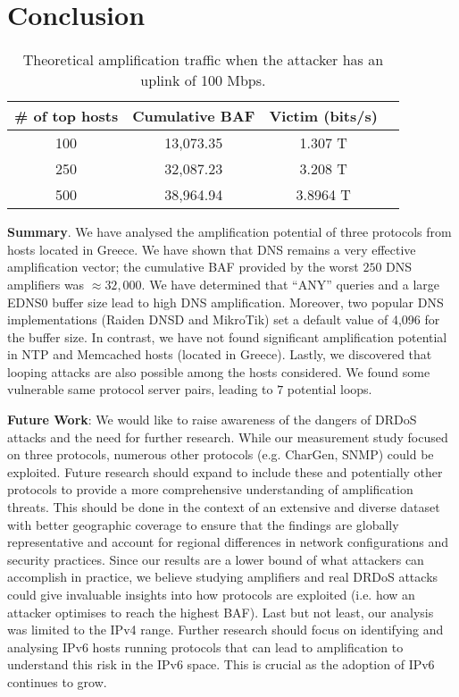\section{Conclusion}

\captionsetup{font=normalsize}
\begin{table}[t]
    \centering
    \caption{Theoretical amplification traffic when the attacker has an uplink of 100 Mbps.}
    \normalsize
    \begin{tabular}{cccc}
    \toprule
    \# of top hosts & Cumulative BAF & Victim (bits/s) \\
    \midrule
    100 & 13,073.35 & 1.307 T \\
    250 & 32,087.23 & 3.208 T \\
    500 & 38,964.94 & 3.8964 T \\
    \bottomrule
    \end{tabular}
\label{tab:data}
\end{table}

 \textbf{Summary}. We have analysed the amplification potential of three protocols from hosts located in Greece. We have shown that DNS remains a very effective amplification vector; the cumulative BAF provided by the worst $250$ DNS amplifiers was $\approx 32,000$. We have determined that ``ANY'' queries and a large EDNS0 buffer size lead to high DNS amplification. Moreover, two popular DNS implementations (Raiden DNSD and MikroTik) set a default value of 4,096 for the buffer size. In contrast, we have not found significant amplification potential in NTP and Memcached hosts (located in Greece). Lastly, we discovered that looping attacks are also possible among the hosts considered. We found some vulnerable same protocol server pairs, leading to $7$ potential loops. 


 \textbf{Future Work}: We would like to raise awareness of the dangers of DRDoS attacks and the need for further research. While our measurement study focused on three protocols, numerous other protocols (e.g. CharGen, SNMP) could be exploited. Future research should expand to include these and potentially other protocols to provide a more comprehensive understanding of amplification threats. This should be done in the context of an extensive and diverse dataset with better geographic coverage to ensure that the findings are globally representative and account for regional differences in network configurations and security practices. Since our results are a lower bound of what attackers can accomplish in practice, we believe studying amplifiers and real DRDoS attacks could give invaluable insights into how protocols are exploited (i.e. how an attacker optimises to reach the highest BAF). Last but not least, our analysis was limited to the IPv4 range. Further research should focus on identifying and analysing IPv6 hosts running protocols that can lead to amplification to understand this risk in the IPv6 space. This is crucial as the adoption of IPv6 continues to grow.

\clearpage



